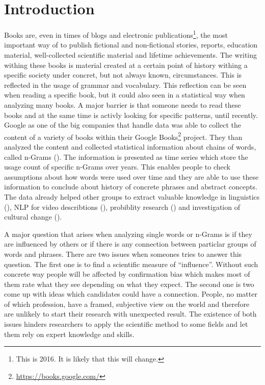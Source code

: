 \chapter{Introduction}
\label{ch:Introduction}

Books are, even in times of blogs and electronic publications\footnote{This is 2016. It is likely that this will change.}, the most important way of to publish fictional and non-fictional stories, reports, education material, well-collected scientific material and lifetime achievements. The writing withing these books is material created at a certain point of history withing a specific society under concret, but not always known, circumstances. This is reflected in the usage of grammar and vocabulary. This reflection can be seen when reading a specific book, but it could also seen in a statistical way when analyzing many books. A major barrier is that someone needs to read these books and at the same time is activly looking for specific patterns, until recently. Google as one of the big companies that handle data was able to collect the content of a variety of books within their Google Books\footnote{\url{https://books.google.com/}} project. They than analyzed the content and collected statistical information about chains of words, called n-Grams (\cite{Google_nGrams}). The information is presented as time series which store the usage count of specific n-Grams over years. This enables people to check assumptions about how words were used over time and they are able to use these information to conclude about history of concrete phrases and abstract concepts. The data already helped other groups to extract valuable knowledge in linguistics (\cite{others1,others5,others7}), NLP for video describtions (\cite{others2}), probiblity research (\cite{others3,others6}) and investigation of cultural change (\cite{others4}).

A major question that arises when analyzing single words or n-Grams is if they are influenced by others or if there is any connection between particlar groups of words and phrases. There are two issues when someones tries to answer this question. The first one is to find a scientific measure of \enquote{influence}. Without such concrete way people will be affected by confirmation bias which makes most of them rate what they see depending on what they expect. The second one is two come up with ideas which candidates could have a connection. People, no matter of which profession, have a framed, subjective view on the world and therefore are unlikely to start their research with unexpected result. The existence of both issues hinders researchers to apply the scientific method to some fields and let them rely on expert knowledge and skills.

